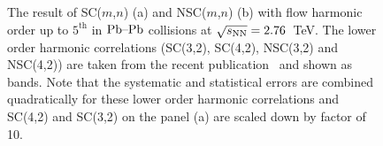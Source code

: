 \begin{figure}[h]
            \begin{center}
        \caption{The result of SC($m$,$n$) (a) and NSC($m$,$n$) (b) with flow harmonic order up to $5^{\mathrm{th}}$ in $\textnormal{Pb--Pb}$ collisions at $\sqrt{s_{\textnormal{NN}}}=2.76$~TeV. The lower order harmonic correlations (SC(3,2), SC(4,2), NSC(3,2) and NSC(4,2)) are taken from the recent publication~\cite{ALICE:2016kpq} and shown as bands. Note that the systematic and statistical errors are combined quadratically for these lower order harmonic correlations  and SC(4,2) and SC(3,2) on the panel (a) are scaled down by factor of 10.}
        \label{fig:Figure_1}
              \end{center}
\end{figure}


